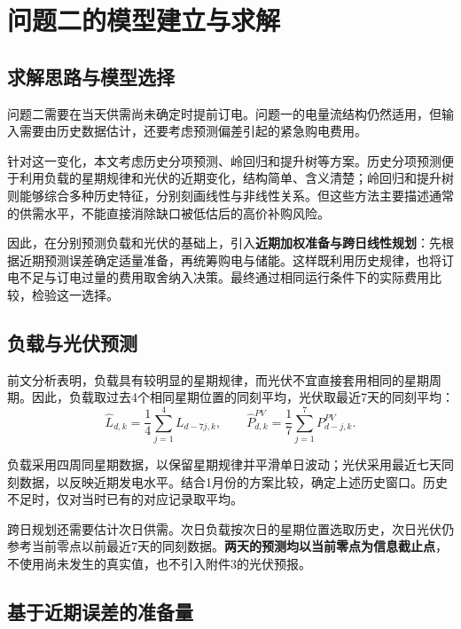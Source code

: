 \section{问题二的模型建立与求解}

\subsection{求解思路与模型选择}

问题二需要在当天供需尚未确定时提前订电。问题一的电量流结构仍然适用，但输入需要由历史数据估计，还要考虑预测偏差引起的紧急购电费用。

针对这一变化，本文考虑历史分项预测、岭回归和提升树等方案。历史分项预测便于利用负载的星期规律和光伏的近期变化，结构简单、含义清楚；岭回归和提升树则能够综合多种历史特征，分别刻画线性与非线性关系。但这些方法主要描述通常的供需水平，不能直接消除缺口被低估后的高价补购风险。

因此，在分别预测负载和光伏的基础上，引入\textbf{近期加权准备与跨日线性规划}：先根据近期预测误差确定适量准备，再统筹购电与储能。这样既利用历史规律，也将订电不足与订电过量的费用取舍纳入决策。最终通过相同运行条件下的实际费用比较，检验这一选择。

\subsection{负载与光伏预测}

前文分析表明，负载具有较明显的星期规律，而光伏不宜直接套用相同的星期周期。因此，负载取过去4个相同星期位置的同刻平均，光伏取最近7天的同刻平均：
\begin{equation}
\widehat L_{d,k}=\frac{1}{4}\sum_{j=1}^{4}L_{d-7j,k},
\qquad
\widehat P^{PV}_{d,k}=\frac{1}{7}\sum_{j=1}^{7}P^{PV}_{d-j,k}.
\label{eq:q2_forecast}
\end{equation}

负载采用四周同星期数据，以保留星期规律并平滑单日波动；光伏采用最近七天同刻数据，以反映近期发电水平。结合1月份的方案比较，确定上述历史窗口。历史不足时，仅对当时已有的对应记录取平均。

跨日规划还需要估计次日供需。次日负载按次日的星期位置选取历史，次日光伏仍参考当前零点以前最近7天的同刻数据。\textbf{两天的预测均以当前零点为信息截止点}，不使用尚未发生的真实值，也不引入附件3的光伏预报。

\subsection{基于近期误差的准备量}

